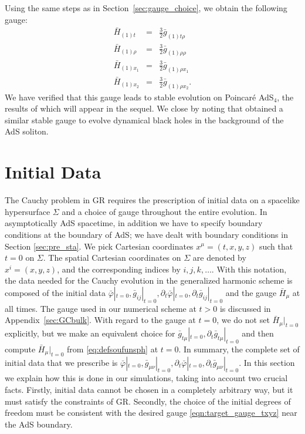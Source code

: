 \documentclass[a4paper,11pt]{article}
\numberwithin{equation}{section}
\begin{document}
Using the same steps as in Section~\ref{sec:gauge_choice}, we obtain the following gauge:
\begin{eqnarray}
\label{eq:hbold_poincare}
\bar{H}_{(1)t}&=&\frac{3}{2} \bar{g}_{(1)\text{$t$$\rho $}} \nonumber\\
\bar{H}_{(1)\rho}&=&\frac{3}{2} \bar{g}_{(1) \rho \rho }\nonumber\\
\bar{H}_{(1)x_1}&=&\frac{3}{2} \bar{g}_{(1) \rho x_1 }\nonumber\\
\bar{H}_{(1)x_2}&=&\frac{3}{2} \bar{g}_{(1) \rho x_2 }.
\end{eqnarray}
We have verified that this gauge leads to stable evolution on Poincar\'e AdS$_4$, the results of which will appear in the sequel. We close by noting that \cite{Bantilan:2020pay} obtained a similar stable gauge to evolve dynamical black holes in the background of the AdS soliton. 


\section{Initial Data}
\label{sec:initdata}

The Cauchy problem in GR requires the prescription of initial data on a spacelike hypersurface $\Sigma$ and a choice of gauge throughout the entire evolution. In asymptotically AdS spacetime, in addition we have to specify boundary conditions at the boundary of AdS; we have dealt with boundary conditions in Section \ref{sec:pre_sta}. We pick Cartesian coordinates $x^\mu=(t,x,y,z)$ such that $t=0$ on $\Sigma$. The spatial Cartesian coordinates on $\Sigma$ are denoted by $x^i=(x,y,z)$, and the corresponding indices by $i,j,k,\dots$. %
With this notation, the data needed for the Cauchy evolution in the generalized harmonic scheme is composed of the initial data $\bar{\varphi}|_{t=0},\bar{g}_{ij}|_{t=0},\partial_t\bar{\varphi}|_{t=0},\partial_t\bar{g}_{ij}|_{t=0}$ and the gauge $\bar{H}_\mu$ at all times. The gauge used in our numerical scheme at $t>0$ is discussed in Appendix~\ref{sec:GCbulk}. With regard to the gauge at $t=0$, we do not set $\bar{H}_\mu|_{t=0}$ explicitly, but we make an equivalent choice for $\bar{g}_{t\mu}|_{t=0},\partial_t\bar{g}_{t\mu}|_{t=0}$ and then compute $\bar{H}_\mu|_{t=0}$ from \eqref{eq:defsoufunsph} at $t=0$.
In summary, the complete set of initial data that we prescribe is $\bar{\varphi}|_{t=0},\bar{g}_{\mu\nu}|_{t=0},\partial_t\bar{\varphi}|_{t=0},\partial_t\bar{g}_{\mu\nu}|_{t=0}$. In this section we explain how this is done in our simulations, taking into account two crucial facts. Firstly, initial data cannot be chosen in a completely arbitrary way, but it must satisfy the constraints of GR. Secondly, the choice of the initial degrees of freedom must be consistent with the desired gauge \eqref{eqn:target_gauge_txyz} near the AdS boundary. 
\end{document}
